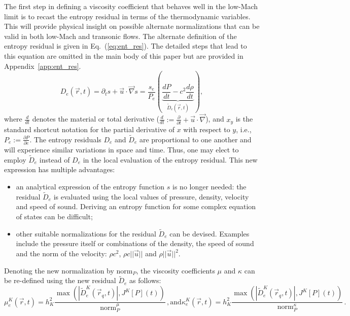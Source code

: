 \documentclass[preprint,10pt]{elsarticle}
\newcommand{\grad}{\vec{\nabla}}
\newcommand{\norm}{\textrm{norm}}
\newcommand{\eqt}[1]{Eq.~(\ref{#1})}                     %
\newcommand{\app}[1]{Appendix~\ref{#1}}                   %
\newcommand{\tcr}[1]{\textcolor{red}{#1}}
\begin{document}
The first step in defining a viscosity coefficient that behaves well in the low-Mach limit is to recast the entropy residual in terms of the thermodynamic variables. This will provide physical insight on possible alternate normalizations that can be valid in both low-Mach and transonic flows. The alternate definition of the entropy residual is given in \eqt{eq:ent_res}. The detailed steps that lead to this equation are omitted in the main body of this paper but are provided in \app{app:ent_res}. 
%
\begin{equation}
\label{eq:ent_res}
D_e(\vec{r},t) = \partial_t s + \vec{u} \cdot \grad s = \frac{s_e}{P_e} \left( \underbrace{\frac{d P}{dt} - c^2 \frac{d \rho}{dt}}_{\tilde{D}_e(\vec{r},t)} \right) ,
\end{equation} 
%
where $\frac{d }{dt}$ denotes the material or total derivative ($\frac{d }{dt}:= \frac{\partial}{\partial t} + \vec{u} \cdot \grad$), and $x_y$ is the standard shortcut notation for the partial derivative of $x$ with respect to $y$, i.e., $P_e:=\frac{\partial P}{\partial e}$. 
%
The entropy residuals $D_e$ and $\tilde{D}_e$ are proportional to one another and will experience similar variations in space and time. Thus, one may elect to employ $\tilde{D}_e$ instead of $D_e$ in the local evaluation of the entropy residual. This new expression has multiple advantages:
%
\begin{itemize}
\item an analytical expression of the entropy function $s$ is no longer needed: the residual $\tilde{D}_e$ is evaluated using the local values of pressure, density, velocity and speed of sound. Deriving an entropy function for some complex equation of states can be difficult;
\item other suitable normalizations for the residual $\tilde{D}_e$ can be devised. Examples include the pressure itself or combinations of the density, the speed of sound and the norm of the velocity: $\rho c^2$, $\rho c || \vec{u} ||$ and $\rho || \vec{u} ||^2$. 
\end{itemize}
%
Denoting the new normalization by $\norm_P$, the viscosity coefficients $\mu$ and $\kappa$ can be re-defined using the new residual $\tilde{D}_e$ as follows:
%
\begin{subequations}
\label{eq:visc_definition}
\begin{equation}
\mu^K_e(\vec{r},t)    = h_K^2 \frac{\max\left( | \tilde{D}^K_e(\vec{r}_q,t) |, J^K[P](t) \right)}{\norm_P^\mu}    \, ,
\end{equation} 
\text{and} 
\begin{equation}
\kappa^K_e(\vec{r},t) = h_K^2 \frac{\max\left( | \tilde{D}^K_e(\vec{r}_q,t) |, J^K[P](t) \right)}{\norm_P^\kappa} \, .
\end{equation}
\end{subequations}
\end{document}

